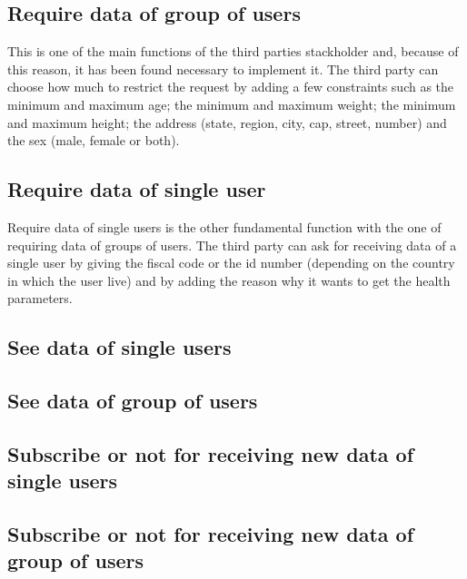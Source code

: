 \subsection{Require data of group of users}
This is one of the main functions of the third parties stackholder and, because of this reason, it has been found necessary to implement it. The third party can choose how much to restrict the request by adding a few constraints such as the minimum and maximum age; the minimum and maximum weight; the minimum and maximum height; the address (state, region, city, cap, street, number) and the sex (male, female or both).

\subsection{Require data of single user}
Require data of single users is the other fundamental function  with the one of requiring data of groups of users. The third party can ask for receiving  data of a single user by giving the fiscal code or the id number (depending on the country in which the user live) and by adding the reason why it wants to get the health parameters.

\subsection{See data of single users}


\subsection{See data of group of users}


\subsection{Subscribe or not for receiving new data of single users}


\subsection{Subscribe or not for receiving new data of group of users}


